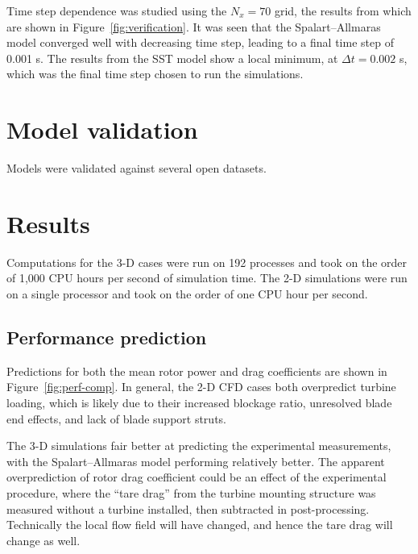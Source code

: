 \documentclass[aip,graphicx]{revtex4-1}
\begin{document}
Time step dependence was studied using the $N_x=70$ grid, the results from which
are shown in Figure~\ref{fig:verification}. It was seen that the
Spalart--Allmaras model converged well with decreasing time step, leading to a
final time step of 0.001 s. The results from the SST model show a local minimum,
at $\Delta t = 0.002$ s, which was the final time step chosen to run the
simulations.


\section{Model validation}

Models were validated against several open datasets.


\section{Results}

Computations for the 3-D cases were run on 192 processes and took on the order
of 1,000 CPU hours per second of simulation time. The 2-D simulations were run
on a single processor and took on the order of one CPU hour per second.


\subsection{Performance prediction}

Predictions for both the mean rotor power and drag coefficients are shown in
Figure~\ref{fig:perf-comp}. In general, the 2-D CFD cases both overpredict
turbine loading, which is likely due to their increased blockage ratio,
unresolved blade end effects, and lack of blade support struts.

The 3-D simulations fair better at predicting the experimental measurements,
with the Spalart--Allmaras model performing relatively better. The apparent
overprediction of rotor drag coefficient could be an effect of the experimental
procedure, where the ``tare drag'' from the turbine mounting structure was
measured without a turbine installed, then subtracted in post-processing.
Technically the local flow field will have changed, and hence the tare drag will
change as well.
\end{document}

